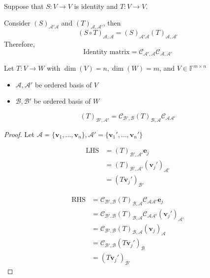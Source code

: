 \begin{corollary}
Suppose that $S:V\to V$ is identity and $T:V\to V$.

Consider $(S)_{\mathcal{A}'\mathcal{A}}$ and $(T)_{\mathcal{A},\mathcal{A}'}$, then
\[
(S\circ T)_{\mathcal{A},\mathcal{A}}
=(S)_{\mathcal{A}'\mathcal{A}}
(T)_{\mathcal{A},\mathcal{A}'}
\]
Therefore,
\[
\text{Identity matrix}
=
\mathcal{C}_{\mathcal{A}',\mathcal{A}}
\mathcal{C}_{\mathcal{A},\mathcal{A}'}
\]
\end{corollary}

\begin{proposition}
Let $T:V\to W$ with $\dim(V)=n,\dim(W)=m$, and $V\in\mathbb{F}^{m\times n}$
\begin{itemize}
\item
$\mathcal{A},\mathcal{A}'$ be ordered basis of $V$
\item
$\mathcal{B},\mathcal{B}'$ be ordered basis of $W$
\end{itemize}
\[
(T)_{\mathcal{B}',\mathcal{A}'}
=
\mathcal{C}_{\mathcal{B}',\mathcal{B}}
(T)_{\mathcal{B},\mathcal{A}}
\mathcal{C}_{\mathcal{A}\mathcal{A}'}
\]
\end{proposition}

\begin{proof}
Let $\mathcal{A}=\{\bm v_1,\dots,\bm v_n\},\mathcal{A}'=\{\bm v_1',\dots,\bm v_n'\}$

\begin{align*}
\text{LHS}&=(T)_{\mathcal{B}',\mathcal{A}'}\bm e_j\\
&=(T)_{\mathcal{B}',\mathcal{A}'}(\bm v_j')_{\mathcal{A}'}\\
&=(T\bm v_j')_{\mathcal{B}'}
\end{align*}

\begin{align*}
\text{RHS}&=\mathcal{C}_{\mathcal{B}',\mathcal{B}}
(T)_{\mathcal{B},\mathcal{A}}
\mathcal{C}_{\mathcal{A}\mathcal{A}'}\bm e_j\\
&=\mathcal{C}_{\mathcal{B}',\mathcal{B}}
(T)_{\mathcal{B},\mathcal{A}}
\mathcal{C}_{\mathcal{A}\mathcal{A}'}(\bm v_j')_{\mathcal{A}'}\\
&=\mathcal{C}_{\mathcal{B}',\mathcal{B}}
(T)_{\mathcal{B},\mathcal{A}}
(\bm v_j)_{\mathcal{A}}\\
&=\mathcal{C}_{\mathcal{B}',\mathcal{B}}
(T\bm v_j')_{\mathcal{B}}\\
&=(T\bm v_j')_{\mathcal{B}'}
\end{align*}
\end{proof}

